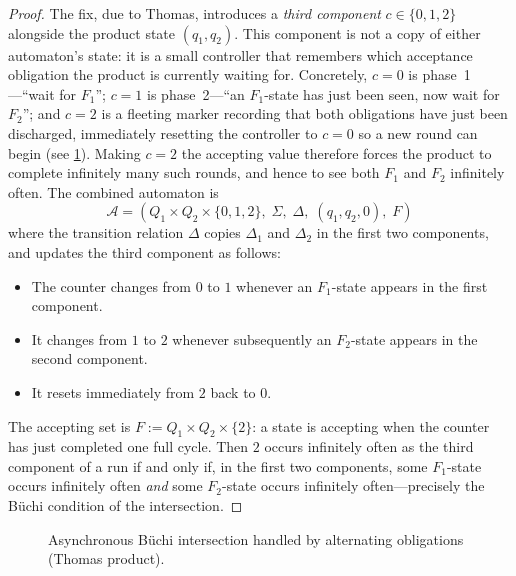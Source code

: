 \begin{proof}
    The fix, due to Thomas, introduces a \emph{third component} $c\in\{0,1,2\}$
    alongside the product state $(q_1,q_2)$.  This component is not a copy
    of either automaton's state: it is a small controller that remembers
    which acceptance obligation the product is currently waiting for.
    Concretely, $c=0$ is phase~1---``wait for $F_1$''; $c=1$ is
    phase~2---``an $F_1$-state has just been seen, now wait for $F_2$'';
    and $c=2$ is a fleeting marker recording that both obligations have
    just been discharged, immediately resetting the controller to $c=0$ so
    a new round can begin (see \cref{fig:buchi-intersection-phases}).
    Making $c=2$ the accepting value therefore forces the product to
    complete infinitely many such rounds, and hence to see both $F_1$ and
    $F_2$ infinitely often.  The combined automaton is
    \[
      \mathcal{A} = (Q_1\times Q_2\times\{0,1,2\},\;\Sigma,\;\Delta,\;(q_1,q_2,0),\;F)
    \]
    where the transition relation $\Delta$ copies $\Delta_1$ and $\Delta_2$ in
    the first two components, and updates the third component as follows:
    \begin{itemize}[nosep]
      \item The counter changes from $0$ to $1$ whenever an $F_1$-state
            appears in the first component.
      \item It changes from $1$ to $2$ whenever subsequently an $F_2$-state
            appears in the second component.
      \item It resets immediately from $2$ back to $0$.
    \end{itemize}
    The accepting set is $F := Q_1\times Q_2\times\{2\}$: a state is
    accepting when the counter has just completed one full cycle.  Then $2$
    occurs infinitely often as the third component of a run if and only if,
    in the first two components, some $F_1$-state occurs infinitely often
    \emph{and} some $F_2$-state occurs infinitely often---precisely the
    B\"uchi condition of the intersection.
\end{proof}

\begin{figure}[ht]
\centering
{}
\caption{Asynchronous B\"uchi intersection handled by alternating obligations (Thomas product).}
\label{fig:buchi-intersection-phases}
\end{figure}

